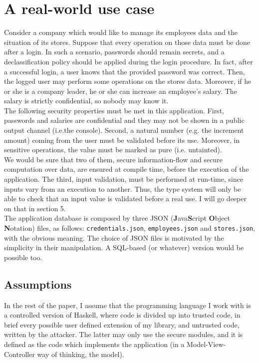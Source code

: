 \section{A real-world use case}\label{sec:example}
Consider a company which would like to manage its employees data and the situation of its stores. Suppose that every operation on those data must be done after a login. In such a scenario, passwords should remain secrets, and a declassification policy should be applied during the login procedure. In fact, after a successful login, a user knows that the provided password was correct. Then, the logged user may perform some operations on the stores data. Moreover, if he or she is a company leader, he or she can increase an employee's salary. The salary is strictly confidential, so nobody may know it. \\
The following security properties must be met in this application. First, passwords and salaries are confidential and they may not be shown in a public output channel (i.e.the console). Second, a natural number (e.g. the increment amount) coming from the user must be validated before its use. Moreover, in sensitive operations, the value must be marked as pure (i.e. untainted). \\
We would be sure that two of them, secure information-flow and secure computation over data, are ensured at compile time, before the execution of the application. The third, input validation, must be performed at run-time, since inputs vary from an execution to another. Thus, the type system will only be able to check that an input value is validated before a real use. I will go deeper on that in section 5. \\
The application database is composed by three JSON (\textbf{J}ava\textbf{S}cript \textbf{O}bject \textbf{N}otation) files, as follows: \texttt{credentials.json}, \texttt{employees.json} and \texttt{stores.json}, with the obvious meaning. The choice of JSON files is motivated by the simplicity in their manipulation. A SQL-based (or whatever) version would be possible too.

\subsection{Assumptions}
In the rest of the paper, I assume that the programming language I work with is a controlled version of Haskell, where code is divided up into trusted code, in brief every possible user defined extension of my library, and untrusted code, written by the attacker. The latter may only use the secure modules, and it is defined as the code which implements the application (in a Model-View-Controller way of thinking, the model). 